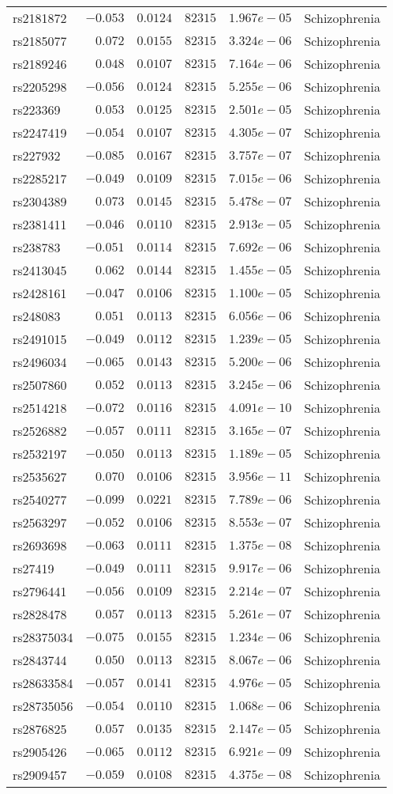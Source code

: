 \begin{tabular}{lrrrrl}
rs2181872&$-0.053$&$0.0124$&$ 82315$&$1.967e-05$&Schizophrenia\tabularnewline
rs2185077&$ 0.072$&$0.0155$&$ 82315$&$3.324e-06$&Schizophrenia\tabularnewline
rs2189246&$ 0.048$&$0.0107$&$ 82315$&$7.164e-06$&Schizophrenia\tabularnewline
rs2205298&$-0.056$&$0.0124$&$ 82315$&$5.255e-06$&Schizophrenia\tabularnewline
rs223369&$ 0.053$&$0.0125$&$ 82315$&$2.501e-05$&Schizophrenia\tabularnewline
rs2247419&$-0.054$&$0.0107$&$ 82315$&$4.305e-07$&Schizophrenia\tabularnewline
rs227932&$-0.085$&$0.0167$&$ 82315$&$3.757e-07$&Schizophrenia\tabularnewline
rs2285217&$-0.049$&$0.0109$&$ 82315$&$7.015e-06$&Schizophrenia\tabularnewline
rs2304389&$ 0.073$&$0.0145$&$ 82315$&$5.478e-07$&Schizophrenia\tabularnewline
rs2381411&$-0.046$&$0.0110$&$ 82315$&$2.913e-05$&Schizophrenia\tabularnewline
rs238783&$-0.051$&$0.0114$&$ 82315$&$7.692e-06$&Schizophrenia\tabularnewline
rs2413045&$ 0.062$&$0.0144$&$ 82315$&$1.455e-05$&Schizophrenia\tabularnewline
rs2428161&$-0.047$&$0.0106$&$ 82315$&$1.100e-05$&Schizophrenia\tabularnewline
rs248083&$ 0.051$&$0.0113$&$ 82315$&$6.056e-06$&Schizophrenia\tabularnewline
rs2491015&$-0.049$&$0.0112$&$ 82315$&$1.239e-05$&Schizophrenia\tabularnewline
rs2496034&$-0.065$&$0.0143$&$ 82315$&$5.200e-06$&Schizophrenia\tabularnewline
rs2507860&$ 0.052$&$0.0113$&$ 82315$&$3.245e-06$&Schizophrenia\tabularnewline
rs2514218&$-0.072$&$0.0116$&$ 82315$&$4.091e-10$&Schizophrenia\tabularnewline
rs2526882&$-0.057$&$0.0111$&$ 82315$&$3.165e-07$&Schizophrenia\tabularnewline
rs2532197&$-0.050$&$0.0113$&$ 82315$&$1.189e-05$&Schizophrenia\tabularnewline
rs2535627&$ 0.070$&$0.0106$&$ 82315$&$3.956e-11$&Schizophrenia\tabularnewline
rs2540277&$-0.099$&$0.0221$&$ 82315$&$7.789e-06$&Schizophrenia\tabularnewline
rs2563297&$-0.052$&$0.0106$&$ 82315$&$8.553e-07$&Schizophrenia\tabularnewline
rs2693698&$-0.063$&$0.0111$&$ 82315$&$1.375e-08$&Schizophrenia\tabularnewline
rs27419&$-0.049$&$0.0111$&$ 82315$&$9.917e-06$&Schizophrenia\tabularnewline
rs2796441&$-0.056$&$0.0109$&$ 82315$&$2.214e-07$&Schizophrenia\tabularnewline
rs2828478&$ 0.057$&$0.0113$&$ 82315$&$5.261e-07$&Schizophrenia\tabularnewline
rs28375034&$-0.075$&$0.0155$&$ 82315$&$1.234e-06$&Schizophrenia\tabularnewline
rs2843744&$ 0.050$&$0.0113$&$ 82315$&$8.067e-06$&Schizophrenia\tabularnewline
rs28633584&$-0.057$&$0.0141$&$ 82315$&$4.976e-05$&Schizophrenia\tabularnewline
rs28735056&$-0.054$&$0.0110$&$ 82315$&$1.068e-06$&Schizophrenia\tabularnewline
rs2876825&$ 0.057$&$0.0135$&$ 82315$&$2.147e-05$&Schizophrenia\tabularnewline
rs2905426&$-0.065$&$0.0112$&$ 82315$&$6.921e-09$&Schizophrenia\tabularnewline
rs2909457&$-0.059$&$0.0108$&$ 82315$&$4.375e-08$&Schizophrenia\tabularnewline

\end{tabular}
